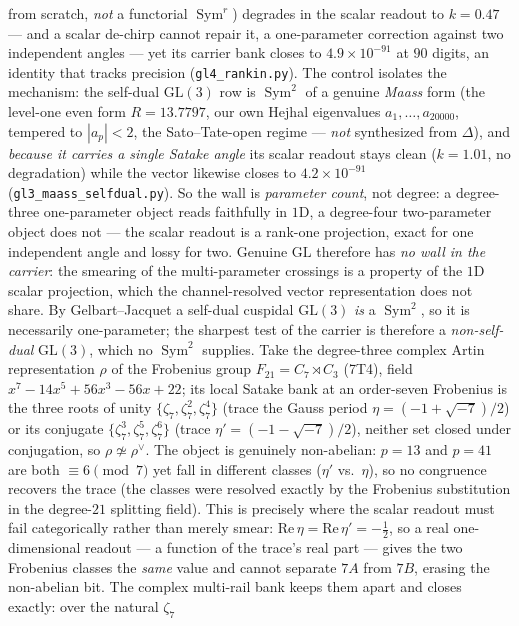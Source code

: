 \documentclass[11pt]{article}
\theoremstyle{definition}
\newcommand{\Sym}{\operatorname{Sym}}
\begin{document}
from scratch, \emph{not} a functorial $\Sym^r$) degrades in the scalar readout to $k=0.47$ --- and a scalar
de-chirp cannot repair it, a one-parameter correction against two independent angles --- yet its carrier bank
closes to $4.9\times10^{-91}$ at $90$ digits, an identity that tracks precision (\texttt{gl4\_rankin.py}). The
control isolates the mechanism: the self-dual $\mathrm{GL}(3)$ row is $\Sym^2$ of a genuine \emph{Maass} form
(the level-one even form $R=13.7797$, our own Hejhal eigenvalues $a_1,\dots,a_{20000}$, tempered to $|a_p|<2$,
the Sato--Tate-open regime --- \emph{not} synthesized from $\Delta$), and \emph{because it carries a single
Satake angle} its scalar readout stays clean ($k=1.01$, no degradation) while the vector likewise closes to
$4.2\times10^{-91}$ (\texttt{gl3\_maass\_selfdual.py}). So the wall is \emph{parameter count}, not degree: a
degree-three one-parameter object reads faithfully in $1$D, a degree-four two-parameter object does not --- the
scalar readout is a rank-one projection, exact for one independent angle and lossy for two. Genuine
$\mathrm{GL}$ therefore has \emph{no wall in the carrier}: the smearing of the multi-parameter crossings is a
property of the $1$D scalar projection, which the channel-resolved vector representation does not share.
By Gelbart--Jacquet a self-dual cuspidal $\mathrm{GL}(3)$ \emph{is} a $\Sym^2$, so it is necessarily
one-parameter; the sharpest test of the carrier is therefore a \emph{non-self-dual} $\mathrm{GL}(3)$, which no
$\Sym^2$ supplies. Take the degree-three complex Artin representation $\rho$ of the Frobenius group
$F_{21}=C_7\rtimes C_3$ (7T4), field $x^7-14x^5+56x^3-56x+22$; its local Satake bank at an order-seven
Frobenius is the three roots of unity $\{\zeta_7,\zeta_7^2,\zeta_7^4\}$ (trace the Gauss period
$\eta=(-1+\sqrt{-7})/2$) or its conjugate $\{\zeta_7^3,\zeta_7^5,\zeta_7^6\}$ (trace $\eta'=(-1-\sqrt{-7})/2$),
neither set closed under conjugation, so $\rho\not\simeq\rho^\vee$. The object is genuinely non-abelian:
$p=13$ and $p=41$ are both $\equiv6\pmod7$ yet fall in different classes ($\eta'$ vs.\ $\eta$), so no congruence
recovers the trace (the classes were resolved exactly by the Frobenius substitution in the degree-$21$ splitting
field). This is precisely where the scalar readout must fail categorically rather than merely smear:
$\mathrm{Re}\,\eta=\mathrm{Re}\,\eta'=-\tfrac12$, so a real one-dimensional readout --- a function of the trace's
real part --- gives the two Frobenius classes the \emph{same} value and cannot separate $7A$ from $7B$, erasing
the non-abelian bit. The complex multi-rail bank keeps them apart and closes exactly: over the natural $\zeta_7$
\end{document}
